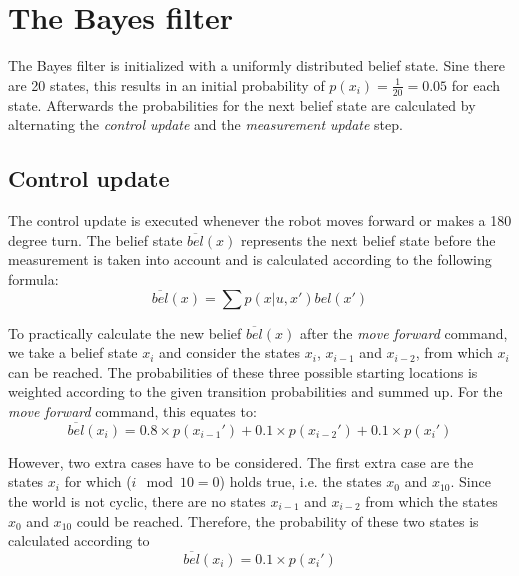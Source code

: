 \documentclass[10pt,a4paper]{article}
\begin{document}
	\section{The Bayes filter}
	The Bayes filter is initialized with a uniformly distributed belief state. Sine there are 20 states, this results in an initial probability of $p(x_i)=\frac{1}{20}=0.05$ for each state. Afterwards the probabilities for the next belief state are calculated by alternating the \textit{control update} and the \textit{measurement update} step.
	
		\subsection{Control update}
		The control update is executed whenever the robot moves forward or makes a 180 degree turn. The belief state $\overline{bel}(x)$ represents the next belief state before the measurement is taken into account and is calculated according to the following formula:
		\begin{displaymath}
			\overline{bel}(x) = \sum p(x|u,x')bel(x')
		\end{displaymath}
		
		To practically calculate the new belief $\overline{bel}(x)$ after the \textit{move forward} command, we take a belief state $x_i$ and consider the states $x_i$, $x_{i-1}$ and $x_{i-2}$, from which $x_i$ can be reached. The probabilities of these three possible starting locations is weighted according to the given transition probabilities and summed up. For the \textit{move forward} command, this equates to:
		\begin{displaymath}
			\overline{bel}(x_i) = 0.8\times p(x_{i-1}') + 0.1\times p(x_{i-2}') + 0.1\times p(x_i')
		\end{displaymath}
		
		However, two extra cases have to be considered. The first extra case are the states $x_i$ for which ($i \mod{10} = 0$) holds true, i.e. the states $x_0$ and $x_{10}$. Since the world is not cyclic, there are no states $x_{i-1}$ and $x_{i-2}$ from which the states $x_0$ and $x_{10}$ could be reached. Therefore, the probability of these two states is calculated according to
		\begin{displaymath}
			\overline{bel}(x_i) = 0.1\times p(x_i')
		\end{displaymath}
		
\end{document}
